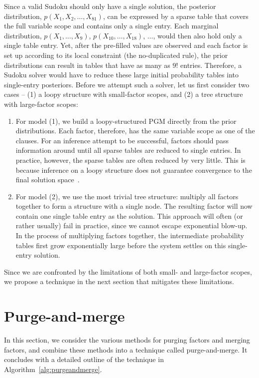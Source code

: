 \documentclass{ieeeaccess}
\begin{document}
Since a valid Sudoku should only have a single solution, the posterior distribution, $p(X_1, X_2, \ldots, X_{81})$, can be expressed by a sparse table that covers the full variable scope and contains only a single entry. Each marginal distribution, $p(X_1,\ldots,X_9)$, $p(X_{10},\ldots,X_{18})$, $\dots$, would then also hold only a single table entry. Yet, after the pre-filled values are observed and each factor is set up according to its local constraint (the no-duplicated rule), the prior distributions can result in tables that have as many as $9!$ entries. Therefore, a Sudoku solver would have to reduce these large initial probability tables into single-entry posteriors. Before we attempt such a solver, let us first consider two cases -- (1) a loopy structure with small-factor scopes, and (2) a tree structure with large-factor scopes:
\begin{enumerate}
	
	\item
	For model (1), we build a loopy-structured PGM directly from the prior distributions. Each factor, therefore, has the same variable scope as one of the clauses. For an inference attempt to be successful, factors should pass information around until all sparse tables are reduced to single entries. In practice, however, the sparse tables are often reduced by very little. This is because inference on a loopy structure does not guarantee convergence to the final solution space~\cite{dechter2010on}.
	
	\item
	For model (2), we use the most trivial tree structure: multiply all factors together to form a structure with a single node. The resulting factor will now contain one single table entry as the solution. This approach will often (or rather usually) fail in practice, since we cannot escape exponential blow-up. In the process of multiplying factors together, the intermediate probability tables first grow exponentially large before the system settles on this single-entry solution.
	
\end{enumerate}

Since we are confronted by the limitations of both small- and large-factor scopes, we propose a technique in the next section that mitigates these limitations.

\section{Purge-and-merge}\label{sec:purgeandmerge-main}
In this section, we consider the various methods for purging factors and merging factors, and combine these methods into a technique called purge-and-merge. It concludes with a detailed outline of the technique in Algorithm~\ref{alg:purgeandmerge}.
\end{document}
